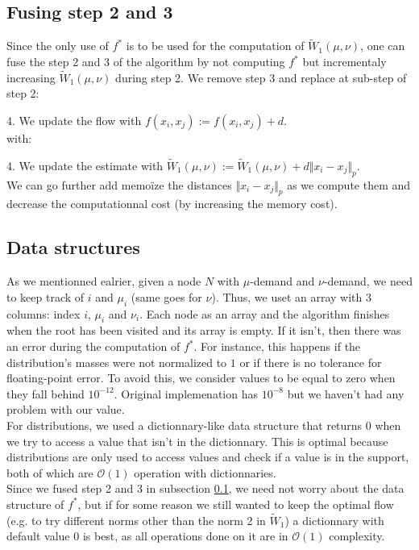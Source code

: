 \documentclass[11pt]{article}
\begin{document}
\subsection{Fusing step 2 and 3} \label{ssec:fuse23}
Since the only use of $f^*$ is to be used for the computation of $\widetilde{W}_1(\mu, \nu)$, one can fuse the step 2 and 3 of the algorithm by not computing $f^*$ but incrementaly increasing $\widetilde{W}_1(\mu, \nu)$ during step 2. We remove step 3 and replace at sub-step of step 2:

4. We update the flow with $f(x_i, x_j) := f(x_i, x_j) + d$.
\\
with:

4. We update the estimate with $\widetilde{W}_1(\mu, \nu) := \widetilde{W}_1(\mu, \nu) + d \Vert x_i - x_j \Vert_p $.
\\
We can go further add memoïze the distances $\Vert x_i - x_j \Vert_p$ as we compute them and decrease the computationnal cost (by increasing the memory cost).

\subsection{Data structures}\label{ssec:DataSctructures}
As we mentionned ealrier, given a node $N$ with $\mu$-demand and $\nu$-demand, we need to keep track of $i$ and $\mu_i$ (same goes for $\nu$). Thus, we uset an array with 3 columns: index $i$, $\mu_i$ and $\nu_i$. Each node as an array and the algorithm finishes when the root has been visited and its array is empty. If it isn't, then there was an error during the computation of $f^*$. For instance, this happens if the distribution's masses were not normalized to $1$ or if there is no tolerance for floating-point error. To avoid this, we consider values to be equal to zero when they fall behind $10^{-12}$. Original implemenation \cite{FlowtreeGit} has $10^{-8}$ but we haven't had any problem with our value.\\ 
For distributions, we used a dictionnary-like data structure that returns $0$ when we try to access a value that isn't in the dictionnary. This is optimal because distributions are only used to access values and check if a value is in the support, both of which are $\mathcal{O}(1)$ operation with dictionnaries.\\
Since we fused step 2 and 3 in subsection \ref{ssec:fuse23}, we need not worry about the data structure of $f^*$, but if for some reason we still wanted to keep the optimal flow (e.g. to try different norms other than the norm 2 in $\widetilde{W}_1$) a dictionnary with default value $0$ is best, as all operations done on it are in $\mathcal{O}(1)$ complexity.
\end{document}
